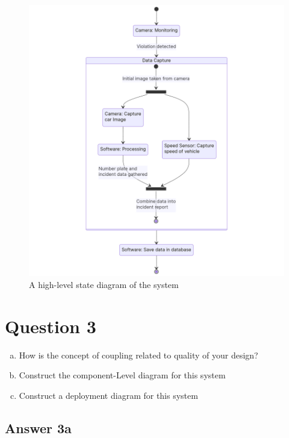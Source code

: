 \documentclass[
  11pt, %
]{assignment}
\begin{document}
\begin{figure}[h!]
  \centering
  \includegraphics[width=\linewidth]{graphics/state.png}
  \caption{A high-level state diagram of the system}
\end{figure}

\pagebreak

\section*{Question 3}
\begin{problem}
\begin{enumerate}[a.]
  \item How is the concept of coupling related to quality of your design?
  \item Construct the component-Level diagram for this system
  \item Construct a deployment diagram for this system
\end{enumerate}
\end{problem}

\subsection*{Answer 3a}
\end{document}
